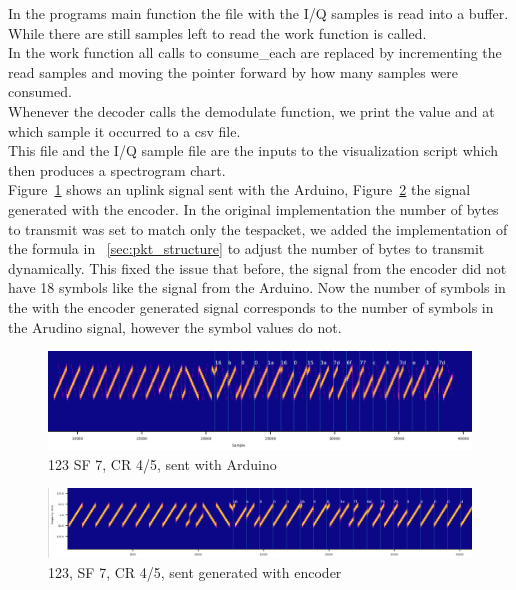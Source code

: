 In the programs main function the file with the I/Q samples is read into a buffer.
While there are still samples left to read the work function is called.
\\
In the work function all calls to consume\_each are replaced by incrementing the read samples and
moving the pointer forward by how many samples were consumed.\\
Whenever the decoder calls the demodulate function, we print the value and at which sample it occurred to a csv file.\\
This file and the I/Q sample file are the inputs to the visualization script which then produces a spectrogram chart. \\
Figure~\ref{fig:123_ard} shows an uplink signal sent with the Arduino, Figure~\ref{fig:123_enc} the signal generated with the encoder.
In the original implementation the number of bytes to transmit was set to match only the tespacket, we added the implementation of the formula in
~\ref{sec:pkt_structure} to adjust the number of bytes to transmit dynamically.
This fixed the issue that before, the signal from the encoder did not have 18 symbols like the signal from the Arduino.
Now the number of symbols in the with the encoder generated signal corresponds to the number of symbols in the Arudino signal, however 
the symbol values do not.


\begin{figure}[h]
    \centering
    \includegraphics[width=1\textwidth]{figures/123_SF7_CR4_5_arduino.png}
    \caption{123 SF 7, CR 4/5, sent with Arduino}
    \label{fig:123_ard}
\end{figure}

\begin{figure}[h]
    \centering
    \includegraphics[width=1\textwidth]{figures/123_SF7_CR4_5_from_encode_18_symbols.png}
    \caption{123, SF 7, CR 4/5, sent generated with encoder}
    \label{fig:123_enc}
\end{figure}









